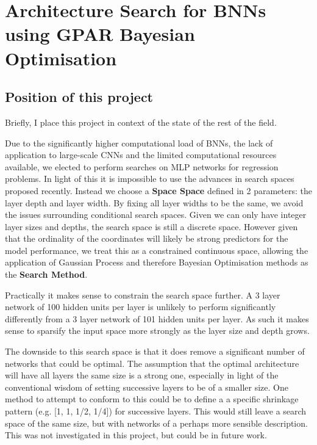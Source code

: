 \chapter{Architecture Search for BNNs using GPAR Bayesian Optimisation}

\ifpdf
    \graphicspath{{Chapter3/Figs/Raster/}{Chapter3/Figs/PDF/}{Chapter3/Figs/}}
\else
    \graphicspath{{Chapter3/Figs/Vector/}{Chapter3/Figs/}}
\fi

\section{Position of this project}

Briefly, I place this project in context of the state of the rest of the field.

Due to the significantly higher computational load of BNNs, the lack of application to large-scale CNNs and the limited computational resources available, we elected to perform searches on MLP networks for regression problems. In light of this it is impossible to use the advances in search spaces proposed recently. Instead we choose a \textbf{Space Space} defined in 2 parameters: the layer depth and layer width. By fixing all layer widths to be the same, we avoid the issues surrounding conditional search spaces. Given we can only have integer layer sizes and depths, the search space is still a discrete space. However given that the ordinality of the coordinates will likely be strong predictors for the model performance, we treat this as a constrained continuous space, allowing the application of Gaussian Process and therefore Bayesian Optimisation methods as the \textbf{Search Method}.

Practically it makes sense to constrain the search space further. A 3 layer network of 100 hidden units per layer is unlikely to perform significantly differently from a 3 layer network of 101 hidden units per layer. As such it makes sense to sparsify the input space more strongly as the layer size and depth grows.

The downside to this search space is that it does remove a significant number of networks that could be optimal. The assumption that the optimal architecture will have all layers the same size is a strong one, especially in light of the conventional wisdom of setting successive layers to be of a smaller size. One method to attempt to conform to this could be to define a a specific shrinkage pattern (e.g. [1, 1, 1/2, 1/4]) for successive layers. This would still leave a search space of the same size, but with networks of a perhaps more sensible description. This was not investigated in this project, but could be in future work. 

